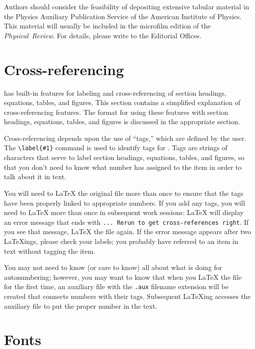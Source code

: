 Authors should consider the feasibility of depositing extensive tabular
material in the Physics Auxiliary Publication Service of the American
Institute of Physics.  This material will usually be included in the
microfilm edition of the {\em Physical~Review}. For details, please write
to the Editorial Offices.


\section{Cross-referencing}
\label{sec:xrefs}

\REVTeX{} has built-in features for labeling and cross-referencing of
section headings, equations, tables, and figures. This section contains a
simplified explanation of cross-referencing features.  The format for using
these features with section headings, equations, tables, and figures is
discussed in the appropriate section.

Cross-referencing depends upon the use of ``tags,'' which are defined by
the user.  The \verb+\label{#1}+ command is used to identify tags for
\REVTeX . Tags are strings of characters that serve to label section
headings, equations, tables, and  figures, so that you don't need to know
what number \REVTeX{} has assigned to the item in order to talk about it in
text.

You will need to \LaTeX{} the original file more than once to ensure that
the tags have been properly linked to appropriate numbers.  If you add any
tags, you will need to \LaTeX{} more than once in subsequent work sessions:
\LaTeX{} will display an error message that ends with {\tt ... Rerun to get
cross-references right}. If you see that message, \LaTeX{} the file again.
If the error message appears after two \LaTeX ings, please check your
labels; you probably have referred to an item in text without tagging the
item.

You may not need to know (or care to know) all about what \REVTeX{} is
doing for autonumbering; however, you may want to know that when you
\LaTeX{} the file for the first time, an auxiliary file with the {\tt .aux}
filename extension will be created that connects numbers with their tags.
Subsequent \LaTeX ing accesses the auxiliary file to put the proper number
in the text.

\section{Fonts}
\label{sec:fonts}

